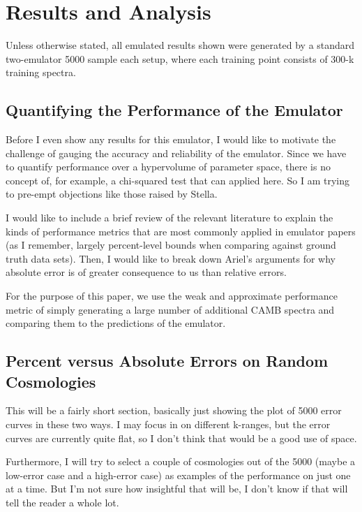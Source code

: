 \chapter{Results and Analysis}

Unless otherwise stated, all emulated results shown were generated by a 
standard two-emulator 5000 sample each setup, where each training point 
consists of 300-k training spectra.

\section{Quantifying the Performance of the Emulator}

Before I even show any results for this emulator, I would like to motivate the 
challenge of gauging the accuracy and reliability of the emulator. Since we 
have to quantify performance over a hypervolume of parameter space, there is 
no concept of, for example, a chi-squared test that can applied here. So I am 
trying to pre-empt objections like those raised by Stella.

I would like to include a brief review of the relevant literature to explain 
the kinds of performance metrics that are most commonly applied in emulator 
papers (as I remember, largely percent-level bounds when comparing against 
ground truth data sets). Then, I would like to break down Ariel's arguments 
for why absolute error is of greater consequence to us than relative errors.

For the purpose of this paper, we use the weak and approximate performance 
metric of simply generating a large number of additional CAMB spectra and 
comparing them to the predictions of the emulator.

\section{Percent versus Absolute Errors on Random Cosmologies}

This will be a fairly short section, basically just showing the plot of 5000 
error curves in these two ways. I may focus in on different k-ranges, but the 
error curves are currently quite flat, so I don't think that would be a good 
use of space.

Furthermore, I will try to select a couple of cosmologies out of the 5000 
(maybe a low-error case and a high-error case) as examples of the performance 
on just one at a time. But I'm not sure how insightful that will be, I don't 
know if that will tell the reader a whole lot.

